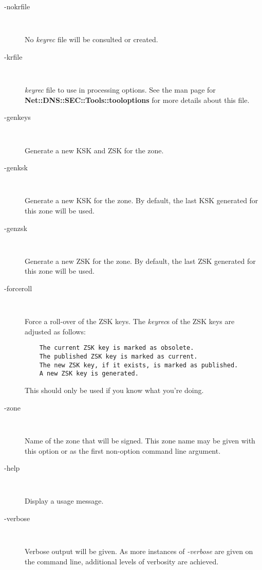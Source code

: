 \begin{description}

\item [-nokrfile]\verb" "

No {\it keyrec} file will be consulted or created.

\item [-krfile]\verb" "

{\it keyrec} file to use in processing options.  See the man page for
{\bf Net::\-DNS::\-SEC::\-Tools::\-tooloptions} for more details about
this file.

\item [-genkeys]\verb" "

Generate a new KSK and ZSK for the zone.

\item [-genksk]\verb" "

Generate a new KSK for the zone.  By default, the last KSK generated for this
zone will be used.

\item [-genzsk]\verb" "

Generate a new ZSK for the zone.  By default, the last ZSK generated for this
zone will be used.

\item [-forceroll]\verb" "

Force a roll-over of the ZSK keys.  The {\it keyrec}s of the ZSK keys are
adjusted as follows:

\begin{verbatim}
    The current ZSK key is marked as obsolete.
    The published ZSK key is marked as current.
    The new ZSK key, if it exists, is marked as published.
    A new ZSK key is generated.
\end{verbatim}

This should only be used if you know what you're doing.

\item [-zone]\verb" "

Name of the zone that will be signed.  This zone name may be given with this
option or as the first non-option command line argument.

\item [-help]\verb" "

Display a usage message.

\item [-verbose]\verb" "

Verbose output will be given.  As more instances of {\it -verbose} are given on
the command line, additional levels of verbosity are achieved.


\end{description}
